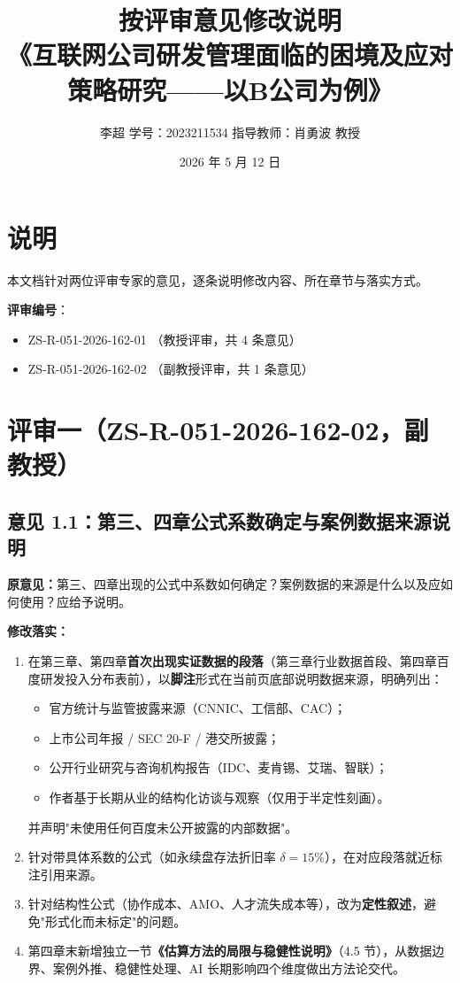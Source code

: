 \documentclass[11pt,a4paper]{ctexart}
\title{\textbf{按评审意见修改说明}\\
\large《互联网公司研发管理面临的困境及应对策略研究——以B公司为例》}
\author{李超 \quad 学号：2023211534 \quad 指导教师：肖勇波 教授}
\date{2026 年 5 月 12 日}
\begin{document}
\maketitle
\thispagestyle{fancy}

\section*{说明}

本文档针对两位评审专家的意见，逐条说明修改内容、所在章节与落实方式。

\vspace{0.5em}
\noindent\textbf{评审编号}：
\begin{itemize}[leftmargin=2em,itemsep=0.2em]
  \item ZS-R-051-2026-162-01 \quad （教授评审，共 4 条意见）
  \item ZS-R-051-2026-162-02 \quad （副教授评审，共 1 条意见）
\end{itemize}

\section{评审一（ZS-R-051-2026-162-02，副教授）}

\subsection{意见 1.1：第三、四章公式系数确定与案例数据来源说明}

\noindent\textbf{原意见：}第三、四章出现的公式中系数如何确定？案例数据的来源是什么以及应如何使用？应给予说明。

\noindent\textbf{修改落实：}
\begin{enumerate}[leftmargin=2em,itemsep=0.3em]
  \item 在第三章、第四章\textbf{首次出现实证数据的段落}（第三章行业数据首段、第四章百度研发投入分布表前），以\textbf{脚注}形式在当前页底部说明数据来源，明确列出：
    \begin{itemize}
      \item 官方统计与监管披露来源（CNNIC、工信部、CAC）；
      \item 上市公司年报 / SEC 20-F / 港交所披露；
      \item 公开行业研究与咨询机构报告（IDC、麦肯锡、艾瑞、智联）；
      \item 作者基于长期从业的结构化访谈与观察（仅用于半定性刻画）。
    \end{itemize}
    并声明"未使用任何百度未公开披露的内部数据"。
  \item 针对带具体系数的公式（如永续盘存法折旧率 $\delta=15\%$），在对应段落就近标注引用来源。
  \item 针对结构性公式（协作成本、AMO、人才流失成本等），改为\textbf{定性叙述}，避免"形式化而未标定"的问题。
  \item 第四章末新增独立一节\textbf{《估算方法的局限与稳健性说明》}（4.5 节），从数据边界、案例外推、稳健性处理、AI 长期影响四个维度做出方法论交代。
\end{enumerate}
\end{document}
